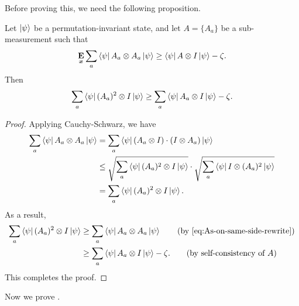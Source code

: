 		Before proving this, we need the following proposition.
		\begin{proposition}\label{prop:cool-prop}
		Let $\ket{\psi}$ be a permutation-invariant state,
		and let $A = \{A_a\}$ be a sub-measurement such that
		\begin{equation*}
		\mathop{\bf E\/}_{{\boldsymbol{x}}} \sum_a \bra{\psi} A_a \otimes A_a \ket{\psi} \geq  \bra{\psi} A \otimes I \ket{\psi} - \zeta.
		\end{equation*}
		Then
		\begin{equation*}
		\sum_a \bra{\psi} (A_a)^2 \otimes I \ket{\psi} \geq \sum_a \bra{\psi} A_a \otimes I \ket{\psi} -\zeta.
		\end{equation*}
		\end{proposition}
		\begin{proof}
		Applying Cauchy-Schwarz, we have
\begin{align}
\sum_a \bra{\psi} A_a \otimes A_a \ket{\psi}
&= \sum_a \bra{\psi} (A_a \otimes I) \cdot (I \otimes A_a) \ket{\psi}\nonumber\\
&\leq \sqrt{\sum_a \bra{\psi} (A_a)^2 \otimes I \ket{\psi}} \cdot \sqrt{\sum_a \bra{\psi} I \otimes (A_a)^2 \ket{\psi}}\nonumber\\
& = \sum_a \bra{\psi} (A_a)^2 \otimes I \ket{\psi}.\label{eq:As-on-same-side-rewrite}
\end{align}
As a result,
\begin{align*}
\sum_a \bra{\psi} (A_a)^2 \otimes I \ket{\psi}
&\geq \sum_a \bra{\psi} A_a \otimes A_a \ket{\psi}\tag{by \Cref{eq:As-on-same-side-rewrite}}\\
&\geq \sum_a \bra{\psi} A_a \otimes I \ket{\psi} -\zeta. \tag{by self-consistency of~$A$}
\end{align*}
This completes the proof.
\end{proof}
		Now we prove .
